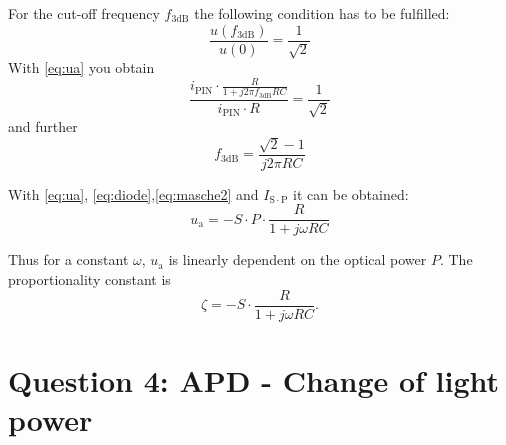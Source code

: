 For the cut-off frequency $f_{\mathrm{3dB}}$ the following condition has to be fulfilled:
\begin{equation}
 \frac{u(f_{\mathrm{3dB}})}{u(0)} = \frac{1}{\sqrt{2}}
\end{equation}
With \eqref{eq:ua} you obtain
\begin{equation}
 \frac{i_{\mathrm{PIN}}\cdot \frac{R}{1+ j2\pi f_{\mathrm{3dB}} RC}}{i_{\mathrm{PIN}}\cdot R} = \frac{1}{\sqrt{2}}
\end{equation}
and further
\begin{equation}
 f_{\mathrm{3dB}} = \frac{\sqrt{2}-1}{j2\pi RC} 
\end{equation}

With \eqref{eq:ua}, \eqref{eq:diode},\eqref{eq:masche2} and $I_{\mathrm{S\cdot P}}$ it can be obtained:
\begin{equation}
 u_{\mathrm{a}} =  -S\cdot P\cdot \frac{R}{1+ j\omega RC} 
\label{eq:}
\end{equation} 

Thus for a constant $\omega$, $u_{\mathrm{a}}$ is linearly dependent on the optical power $P$. The proportionality constant is 
\begin{equation}
\zeta = -S\cdot \frac{R}{1+ j\omega RC}.
\label{eq:}
\end{equation}
 
\section{Question 4: APD - Change of light power}

